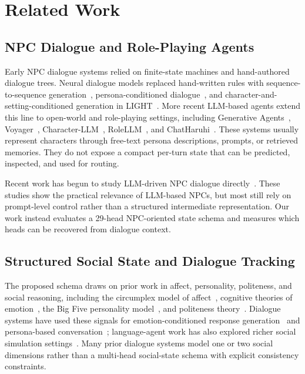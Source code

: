 \documentclass[11pt]{article}
\begin{document}
\section{Related Work}
\label{sec:related}

\subsection{NPC Dialogue and Role-Playing Agents}

Early NPC dialogue systems relied on finite-state machines and hand-authored dialogue trees.
Neural dialogue models replaced hand-written rules with sequence-to-sequence generation~\cite{bordes2017learning}, persona-conditioned dialogue~\cite{zhang2018personalizing}, and character-and-setting-conditioned generation in LIGHT~\cite{urbanek2019learning}.
More recent LLM-based agents extend this line to open-world and role-playing settings, including Generative Agents~\cite{park2023generative}, Voyager~\cite{wang2023voyager}, Character-LLM~\cite{shao2023character}, RoleLLM~\cite{wang2024rolellm}, and ChatHaruhi~\cite{li2023chatharuhi}.
These systems usually represent characters through free-text persona descriptions, prompts, or retrieved memories.
They do not expose a compact per-turn state that can be predicted, inspected, and used for routing.

Recent work has begun to study LLM-driven NPC dialogue directly~\cite{rimer2025talking,buakhaw2025deflanderization,ploug2025open}.
These studies show the practical relevance of LLM-based NPCs, but most still rely on prompt-level control rather than a structured intermediate representation.
Our work instead evaluates a 29-head NPC-oriented state schema and measures which heads can be recovered from dialogue context.

\subsection{Structured Social State and Dialogue Tracking}

The proposed schema draws on prior work in affect, personality, politeness, and social reasoning, including the circumplex model of affect~\cite{russell1980circumplex}, cognitive theories of emotion~\cite{oatley1987towards}, the Big Five personality model~\cite{digman1990personality}, and politeness theory~\cite{brown1987politeness}.
Dialogue systems have used these signals for emotion-conditioned response generation~\cite{zhou2018emotional} and persona-based conversation~\cite{li2016persona}; language-agent work has also explored richer social simulation settings~\cite{park2023generative,zhou2024sotopia,zhou2025social}.
Many prior dialogue systems model one or two social dimensions rather than a multi-head social-state schema with explicit consistency constraints.
\end{document}
